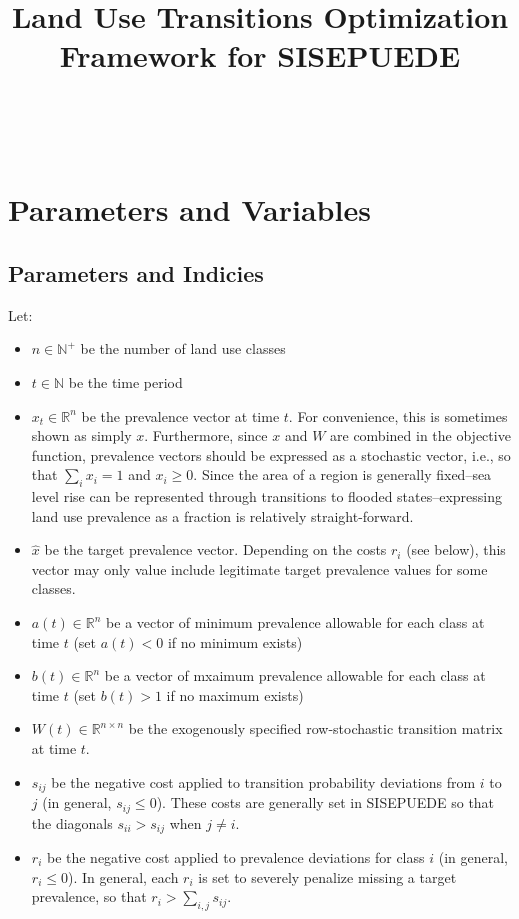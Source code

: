\documentclass[10pt]{article}
\title{Land Use Transitions Optimization Framework for SISEPUEDE}
\begin{document}
\maketitle

%
%
% 
\
\section*{Parameters and Variables}

\subsection*{Parameters and Indicies}

Let:
\begin{itemize}
\item
$n \in \mathbb{N}^+$ be the number of land use classes

\item
$t \in \mathbb{N}$ be the time period

\item
$x_t \in \mathbb{R}^n$ be the prevalence vector at time $t$. For convenience, this is sometimes shown as simply $x$. Furthermore, since $x$ and $W$ are combined in the objective function, prevalence vectors should be expressed as a stochastic vector, i.e., so that $\sum_i x_i = 1$ and $x_i \geq 0$. Since the area of a region is generally fixed--sea level rise can be represented through transitions to flooded states--expressing land use prevalence as a fraction is relatively straight-forward.

\item
$\hat{x}$ be the target prevalence vector. Depending on the costs $r_i$ (see below), this vector may only value include legitimate target prevalence values for some classes.
 
\item
$a(t) \in \mathbb{R}^n$ be a vector of minimum prevalence allowable for each class at time $t$ (set $a(t) < 0$ if no minimum exists) 

\item
$b(t) \in \mathbb{R}^n$ be a vector of mxaimum prevalence allowable for each class at time $t$ (set $b(t) > 1$ if no maximum exists) 

\item
$W(t) \in \mathbb{R}^{n \times n}$ be the exogenously specified row-stochastic transition matrix at time $t$.

\item 
$s_{ij}$ be the negative cost applied to transition probability deviations from $i$ to $j$ (in general, $s_{ij} \leq 0$). These costs are generally set in SISEPUEDE so that the diagonals $s_{ii} > s_{ij}$ when $j \not= i$.

\item 
$r_i$ be the negative cost applied to prevalence deviations for class $i$ (in general, $r_i \leq 0$). In general, each $r_i$ is set to severely penalize missing a target prevalence, so that $r_i > \sum_{i, j} s_{ij}$. 

\end{itemize}
\end{document}
